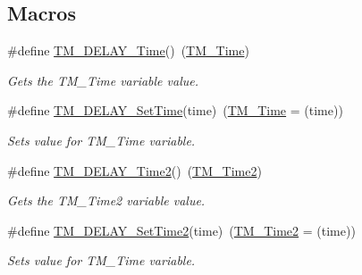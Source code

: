 \subsection*{Macros}
\begin{DoxyCompactItemize}
\item 
\#define \hyperlink{group___t_m___d_e_l_a_y___functions_gaaf46291b088791f6b2025d327a810c16}{T\+M\+\_\+\+D\+E\+L\+A\+Y\+\_\+\+Time}()~(\hyperlink{group___t_m___d_e_l_a_y___variables_ga7c995255b1d6e58256f1b6e1db969000}{T\+M\+\_\+\+Time})
\begin{DoxyCompactList}\small\item\em Gets the T\+M\+\_\+\+Time variable value. \end{DoxyCompactList}\item 
\#define \hyperlink{group___t_m___d_e_l_a_y___functions_ga72caa68e7ce61cb2dcb4ed9e219f58ce}{T\+M\+\_\+\+D\+E\+L\+A\+Y\+\_\+\+Set\+Time}(time)~(\hyperlink{group___t_m___d_e_l_a_y___variables_ga7c995255b1d6e58256f1b6e1db969000}{T\+M\+\_\+\+Time} = (time))
\begin{DoxyCompactList}\small\item\em Sets value for T\+M\+\_\+\+Time variable. \end{DoxyCompactList}\item 
\#define \hyperlink{group___t_m___d_e_l_a_y___functions_ga5781218a9887f4883a311b52c11a7a59}{T\+M\+\_\+\+D\+E\+L\+A\+Y\+\_\+\+Time2}()~(\hyperlink{group___t_m___d_e_l_a_y___variables_ga7a35a6c16b0617fdea660d351139ecc7}{T\+M\+\_\+\+Time2})
\begin{DoxyCompactList}\small\item\em Gets the T\+M\+\_\+\+Time2 variable value. \end{DoxyCompactList}\item 
\#define \hyperlink{group___t_m___d_e_l_a_y___functions_ga6b725c20fcbea9c3f3e549d86434d030}{T\+M\+\_\+\+D\+E\+L\+A\+Y\+\_\+\+Set\+Time2}(time)~(\hyperlink{group___t_m___d_e_l_a_y___variables_ga7a35a6c16b0617fdea660d351139ecc7}{T\+M\+\_\+\+Time2} = (time))
\begin{DoxyCompactList}\small\item\em Sets value for T\+M\+\_\+\+Time variable. \end{DoxyCompactList}\end{DoxyCompactItemize}
